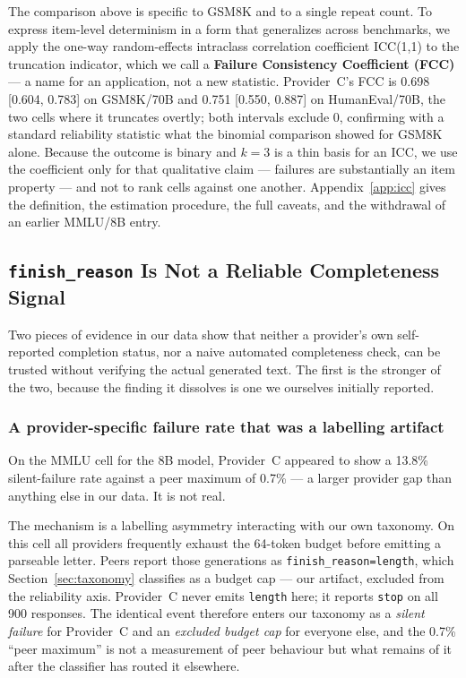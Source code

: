 \documentclass[11pt]{article}
\begin{document}
The comparison above is specific to GSM8K and to a single repeat
count. To express item-level determinism in a form that generalizes
across benchmarks, we apply the one-way random-effects intraclass
correlation coefficient ICC(1,1) \citep{shrout1979icc, mcgraw1996icc}
to the truncation indicator, which we call a \textbf{Failure
Consistency Coefficient (FCC)} --- a name for an application, not a
new statistic. Provider~C's FCC is 0.698 [0.604, 0.783] on GSM8K/70B
and 0.751 [0.550, 0.887] on HumanEval/70B, the two cells where it
truncates overtly; both intervals exclude 0, confirming with a
standard reliability statistic what the binomial comparison showed for
GSM8K alone. Because the outcome is binary and $k{=}3$ is a thin basis
for an ICC, we use the coefficient only for that qualitative claim ---
failures are substantially an item property --- and not to rank cells
against one another. Appendix~\ref{app:icc} gives the definition, the
estimation procedure, the full caveats, and the withdrawal of an
earlier MMLU/8B entry.

\subsection{\texttt{finish\_reason} Is Not a Reliable Completeness
Signal}
\label{sec:finish_reason}

Two pieces of evidence in our data show that neither a provider's own
self-reported completion status, nor a naive automated completeness
check, can be trusted without verifying the actual generated text. The
first is the stronger of the two, because the finding it dissolves is
one we ourselves initially reported.

\subsubsection{A provider-specific failure rate that was a labelling
artifact}
\label{sec:mmlu8b}

On the MMLU cell for the 8B model, Provider~C appeared to show a
13.8\% silent-failure rate against a peer maximum of 0.7\% --- a
larger provider gap than anything else in our data. It is not real.

The mechanism is a labelling asymmetry interacting with our own
taxonomy. On this cell all providers frequently exhaust the 64-token
budget before emitting a parseable letter. Peers report those
generations as \texttt{finish\_reason=length}, which
Section~\ref{sec:taxonomy} classifies as a budget cap --- our
artifact, excluded from the reliability axis. Provider~C never emits
\texttt{length} here; it reports \texttt{stop} on all 900 responses.
The identical event therefore enters our taxonomy as a \emph{silent
failure} for Provider~C and an \emph{excluded budget cap} for
everyone else, and the 0.7\% ``peer maximum'' is not a measurement of
peer behaviour but what remains of it after the classifier has routed
it elsewhere.
\end{document}
